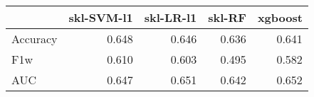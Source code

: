 \begin{tabular}{lrrrr}
\toprule
{} &  skl-SVM-l1 &  skl-LR-l1 &  skl-RF &  xgboost \\
\midrule
Accuracy &       0.648 &      0.646 &   0.636 &    0.641 \\
F1w      &       0.610 &      0.603 &   0.495 &    0.582 \\
AUC      &       0.647 &      0.651 &   0.642 &    0.652 \\
\bottomrule
\end{tabular}
